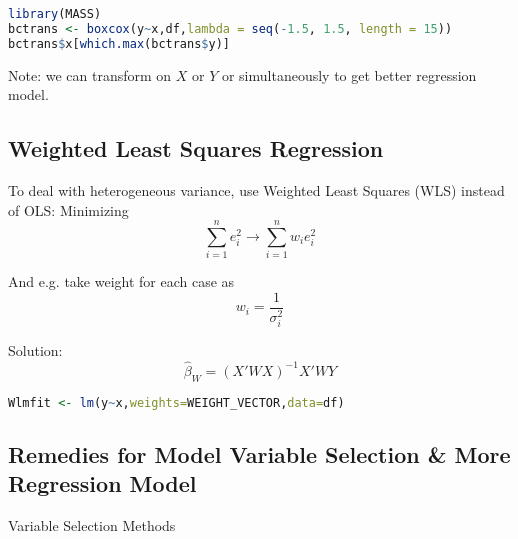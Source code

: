\begin{rcode}
\begin{lstlisting}[language=R]
library(MASS)
bctrans <- boxcox(y~x,df,lambda = seq(-1.5, 1.5, length = 15))
bctrans$x[which.max(bctrans$y)]
\end{lstlisting}

    \end{rcode}
            
            
        Note: we can transform on $ X $ or $ Y $ or simultaneously to get better regression model.
        

\subsection{Weighted Least Squares Regression}
    To deal with heterogeneous variance, use Weighted Least Squares (WLS) instead of OLS: Minimizing
    \begin{equation}
        \sum_{i=1}^ne_i^2\longrightarrow \sum_{i=1}^nw_ie^2_i         
    \end{equation}
    
    And e.g. take weight for each case as 
    \begin{equation}
        w_i=\dfrac{1}{\sigma _i^2} 
    \end{equation}

    Solution:
    \begin{equation}
        \hat{\beta }_W=(X'WX)^{-1}X'WY 
    \end{equation}
    
    
\begin{rcode}
\begin{lstlisting}[language=R]
Wlmfit <- lm(y~x,weights=WEIGHT_VECTOR,data=df)
\end{lstlisting}
\end{rcode}
    
    
    







\subsection{Remedies for Model Variable Selection \& More Regression Model}

\begin{point}
    Variable Selection Methods
\end{point}

